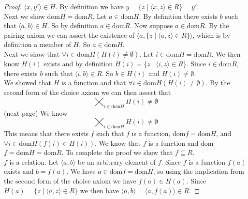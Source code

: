 \documentclass{report}
\begin{document}
\begin{proof}
$\langle x,y'\rangle\in H$. By definition we have $y=\{z\mid\langle x,z\rangle\in R\}=y'$.\\
\indent Next we show $\text{dom}H=\text{dom}R$. Let $a\in\text{dom}H$. By definition there exists $b$ such that $\langle a,b\rangle\in H$. So by definition $a\in\text{dom}R$.
Now suppose $a\in\text{dom}R$. By the pairing axiom we can assert the existence of $\langle a,\{z\mid \langle a,z\rangle\in R\}\rangle$, which is by definition a member of $H$.
So $a\in\text{dom}H$.\\
\indent Next we show that $\forall i\in\text{dom}H(H(i)\neq\emptyset)$. Let $i\in\text{dom}H=\text{dom}R$. We then know $H(i)$ exists and by definition $H(i)=\{z\mid\langle i,z\rangle\in R\}$.
Since $i\in\text{dom}R$, there exists $b$ such that $\langle i,b\rangle\in R$.
So $b\in H(i)$ and $H(i)\neq\emptyset$.\\
\indent We showed that $H$ is a function and that $\forall i\in\text{dom}H(H(i)\neq\emptyset)$.
By the second form of the choice axiom we can then assert that
\begin{equation*}
\bigtimes_{i\in\text{dom}H}H(i)\neq\emptyset
\end{equation*}
(next page)\newpage
We know
\begin{equation*}
\bigtimes_{i\in\text{dom}H}H(i)\neq\emptyset
\end{equation*}
This means that there exists $f$ such that $f$ is a function, dom$f=\text{dom}H$, and $\forall i\in\text{dom}H(f(i)\in H(i))$. We know that $f$ is a function and dom$f=\text{dom}H=\text{dom}R$. 
To complete the proof we show that $f\subseteq R$.\\
\indent $f$ is a relation. Let $\langle a,b\rangle$ be an arbitrary element of $f$. Since $f$ is a function $f(a)$ exists and $b=f(a)$.
We have $a\in\text{dom}f=\text{dom}H$, so using the implication from the second form of the choice axiom we have $f(a)\in H(a)$. Since $H(a)=\{z\mid\langle a,z\rangle\in R\}$ we then have
$\langle a,b\rangle=\langle a,f(a)\rangle\in R$.
\end{proof}
\newpage
\end{document}
